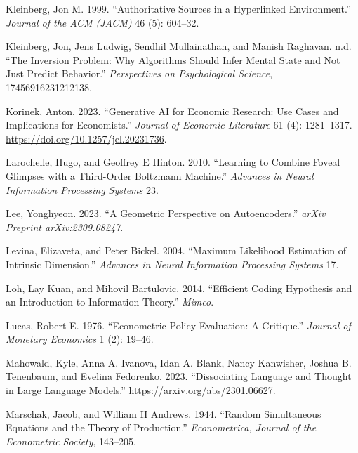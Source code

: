 \documentclass[
]{article}
\newlength{\cslhangindent}
\newenvironment{CSLReferences}[2] %
 {\begin{list}{}{%
  \setlength{\itemindent}{0pt}
  \setlength{\leftmargin}{0pt}
  \setlength{\parsep}{0pt}
  \ifodd #1
   \setlength{\leftmargin}{\cslhangindent}
   \setlength{\itemindent}{-1\cslhangindent}
  \fi
  \setlength{\itemsep}{#2\baselineskip}}}
 {\end{list}}
\begin{document}
\begin{CSLReferences}{1}{0}
Kleinberg, Jon M. 1999. {``Authoritative Sources in a Hyperlinked
Environment.''} \emph{Journal of the ACM (JACM)} 46 (5): 604--32.

Kleinberg, Jon, Jens Ludwig, Sendhil Mullainathan, and Manish Raghavan.
n.d. {``The Inversion Problem: Why Algorithms Should Infer Mental State
and Not Just Predict Behavior.''} \emph{Perspectives on Psychological
Science}, 17456916231212138.

Korinek, Anton. 2023. {``Generative AI for Economic Research: Use Cases
and Implications for Economists.''} \emph{Journal of Economic
Literature} 61 (4): 1281--1317.
\url{https://doi.org/10.1257/jel.20231736}.

Larochelle, Hugo, and Geoffrey E Hinton. 2010. {``Learning to Combine
Foveal Glimpses with a Third-Order Boltzmann Machine.''} \emph{Advances
in Neural Information Processing Systems} 23.

Lee, Yonghyeon. 2023. {``A Geometric Perspective on Autoencoders.''}
\emph{arXiv Preprint arXiv:2309.08247}.

Levina, Elizaveta, and Peter Bickel. 2004. {``Maximum Likelihood
Estimation of Intrinsic Dimension.''} \emph{Advances in Neural
Information Processing Systems} 17.

Loh, Lay Kuan, and Mihovil Bartulovic. 2014. {``Efficient Coding
Hypothesis and an Introduction to Information Theory.''} \emph{Mimeo}.

Lucas, Robert E. 1976. {``Econometric Policy Evaluation: A Critique.''}
\emph{Journal of Monetary Economics} 1 (2): 19--46.

Mahowald, Kyle, Anna A. Ivanova, Idan A. Blank, Nancy Kanwisher, Joshua
B. Tenenbaum, and Evelina Fedorenko. 2023. {``Dissociating Language and
Thought in Large Language Models.''}
\url{https://arxiv.org/abs/2301.06627}.

Marschak, Jacob, and William H Andrews. 1944. {``Random Simultaneous
Equations and the Theory of Production.''} \emph{Econometrica, Journal
of the Econometric Society}, 143--205.


\end{CSLReferences}
\end{document}
